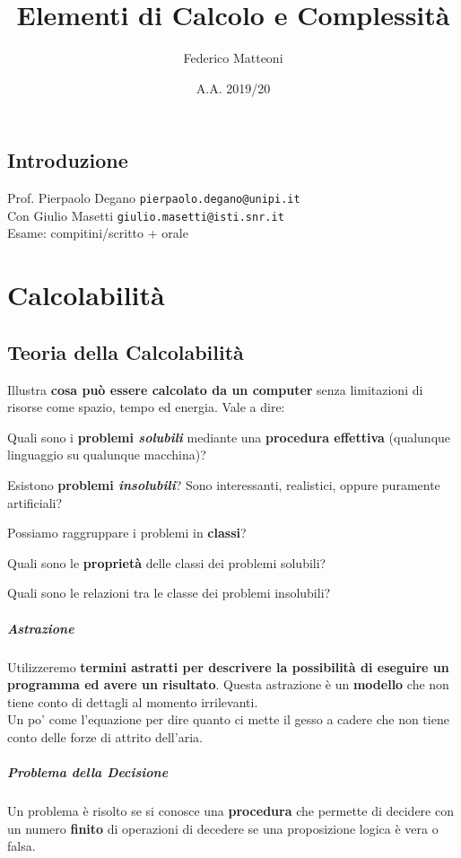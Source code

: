 \documentclass[10pt]{book}
\begin{document}
\renewcommand*\contentsname{Indice}
\title{Elementi di Calcolo e Complessità}
\author{Federico Matteoni}
\date{A.A. 2019/20}
\maketitle
\tableofcontents
\pagebreak
\section*{Introduzione}
Prof. Pierpaolo Degano \texttt{pierpaolo.degano@unipi.it}\\
Con Giulio Masetti \texttt{giulio.masetti@isti.snr.it}\\
Esame: compitini/scritto + orale
\pagebreak
\chapter{Calcolabilità}
\section{Teoria della Calcolabilità}
Illustra \textbf{cosa può essere calcolato da un computer} senza limitazioni di risorse come spazio, tempo ed energia. Vale a dire:
\begin{list}{-}{}
	\item Quali sono i \textbf{problemi \textit{solubili}} mediante una \textbf{procedura effettiva} (qualunque linguaggio su qualunque macchina)?
	\item Esistono \textbf{problemi \textit{insolubili}}? Sono interessanti, realistici, oppure puramente artificiali?
	\item Possiamo raggruppare i problemi in \textbf{classi}?
	\item Quali sono le \textbf{proprietà} delle classi dei problemi solubili?
	\item Quali sono le relazioni tra le classe dei problemi insolubili?
\end{list}
\paragraph{Astrazione} Utilizzeremo \textbf{termini astratti per descrivere la possibilità di eseguire un programma ed avere un risultato}. Questa astrazione è un \textbf{modello} che non tiene conto di dettagli al momento irrilevanti.\\
Un po' come l'equazione per dire quanto ci mette il gesso a cadere che non tiene conto delle forze di attrito dell'aria.
\paragraph{Problema della Decisione} Un problema è risolto se si conosce una \textbf{procedura} che permette di decidere con un numero \textbf{finito} di operazioni di decedere se una proposizione logica è vera o falsa.
\end{document}
